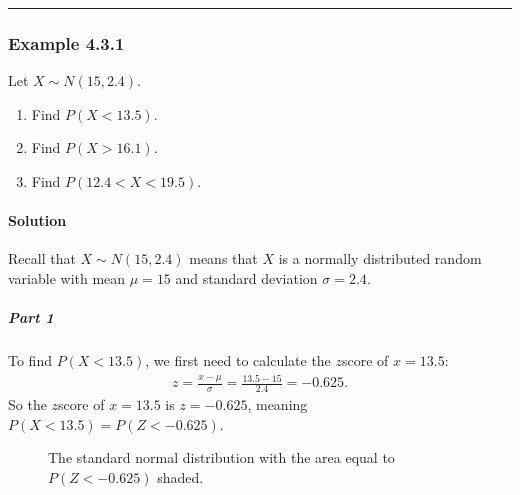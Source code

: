 \documentclass[letterpaper,10pt,english]{jupyterBook}
\begin{document}
\bigskip\hrule\bigskip



\subsubsection{Example 4.3.1}
\label{\detokenize{Ch4 The Normal Distribution and the Central Limit Theorem/4.3 The Normal Distribution and z-scores:example-4-3-1}}
\sphinxAtStartPar
Let \(X \sim N(15, 2.4)\).
\begin{enumerate}
%
\item {} 
\sphinxAtStartPar
Find \(P(X < 13.5)\).

\item {} 
\sphinxAtStartPar
Find \(P(X > 16.1)\).

\item {} 
\sphinxAtStartPar
Find \(P(12.4 < X < 19.5)\).

\end{enumerate}


\paragraph{Solution}
\label{\detokenize{Ch4 The Normal Distribution and the Central Limit Theorem/4.3 The Normal Distribution and z-scores:solution}}
\sphinxAtStartPar
Recall that \(X \sim N(15, 2.4)\) means that \(X\) is a normally distributed random variable with mean \(\mu = 15\) and standard deviation \(\sigma = 2.4\).


\subparagraph{Part 1}
\label{\detokenize{Ch4 The Normal Distribution and the Central Limit Theorem/4.3 The Normal Distribution and z-scores:part-1}}
\sphinxAtStartPar
To find \(P(X < 13.5)\), we first need to calculate the \(z\)\sphinxhyphen{}score of \(x = 13.5\):
\begin{equation*}
\begin{split} z = \frac{x - \mu}{\sigma} = \frac{13.5 - 15}{2.4} = -0.625. \end{split}
\end{equation*}
\sphinxAtStartPar
So the \(z\)\sphinxhyphen{}score of \(x = 13.5\) is \(z = -0.625\), meaning \(P(X < 13.5) = P(Z < -0.625)\).

\begin{figure}[htbp]
\centering
\capstart

\noindent{}
\caption{The standard normal distribution with the area equal to \(P(Z < -0.625)\) shaded.}\label{\detokenize{Ch4 The Normal Distribution and the Central Limit Theorem/4.3 The Normal Distribution and z-scores:stdnormal-ex11}}\end{figure}
\end{document}
